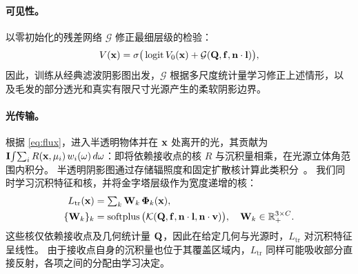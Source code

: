 \paragraph{可见性。}
以零初始化的残差网络 $\mathcal G$ 修正最细层级的检验：
\begin{equation}
  V(\mathbf{x})=\sigma\big(\operatorname{logit} V_0(\mathbf{x})+\mathcal G(\mathbf{Q},\mathbf{f},\mathbf{n}\cdot\mathbf{l})\big),
  \label{eq:visibility}
\end{equation}
因此，训练从经典滤波阴影图出发，$\mathcal G$ 根据多尺度统计量学习修正上述情形，以及毛发的部分透光和真实有限尺寸光源产生的柔软阴影边界。

\paragraph{光传输。}
根据 \cref{eq:flux}，进入半透明物体并在 $\mathbf{x}$ 处离开的光，其贡献为 $\mathbf{I}\!\int\!\sum_i R(\mathbf{x},\mu_i)\,w_i(\omega)\,d\omega$：即将依赖接收点的核 $R$ 与沉积量相乘，在光源立体角范围内积分。
半透明阴影图通过存储辐照度和固定扩散核计算此类积分~\cite{dachsbacher2003translucent,deon2007efficient,jimenez2010real}。
我们同时学习沉积特征和核，并将金字塔层级作为宽度递增的核：
\begin{align}
  L_{\mathrm{tr}}(\mathbf{x})&=\textstyle\sum_{k}\mathbf{W}_k\,\boldsymbol\Phi_k(\mathbf{x}),\label{eq:transfer}\\
  \{\mathbf{W}_k\}_k&=\operatorname{softplus}\big(\mathcal K(\mathbf{Q},\mathbf{f},\mathbf{n}\cdot\mathbf{l},\mathbf{n}\cdot\mathbf{v})\big),\quad \mathbf{W}_k\in\mathbb R_+^{3\times C}.\nonumber
\end{align}
这些核仅依赖接收点及几何统计量 $\mathbf{Q}$，因此在给定几何与光源时，$L_{\mathrm{tr}}$ 对沉积特征呈线性。
由于接收点自身的沉积量也位于其覆盖区域内，$L_{\mathrm{tr}}$ 同样可能吸收部分直接反射，各项之间的分配由学习决定。

